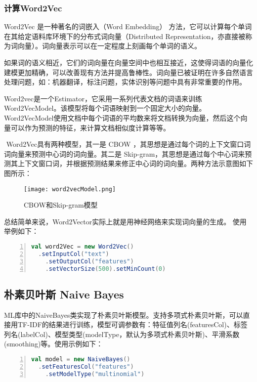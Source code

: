 \documentclass[lang=cn,11pt]{elegantpaper}
\begin{document}
\subsubsection{计算Word2Vec}
Word2Vec 是一种著名的词嵌入（Word Embedding） 方法，它可以计算每个单词在其给定语料库环境下的分布式词向量（Distributed Representation，亦直接被称为词向量）。词向量表示可以在一定程度上刻画每个单词的语义。

如果词的语义相近，它们的词向量在向量空间中也相互接近，这使得词语的向量化建模更加精确，可以改善现有方法并提高鲁棒性。词向量已被证明在许多自然语言处理问题，如：机器翻译，标注问题，实体识别等问题中具有非常重要的作用。

​ Word2vec是一个Estimator，它采用一系列代表文档的词语来训练Word2VecModel。该模型将每个词语映射到一个固定大小的向量。Word2VecModel使用文档中每个词语的平均数来将文档转换为向量，然后这个向量可以作为预测的特征，来计算文档相似度计算等等。

​ Word2Vec具有两种模型，其一是 CBOW ，其思想是通过每个词的上下文窗口词词向量来预测中心词的词向量。其二是 Skip-gram，其思想是通过每个中心词来预测其上下文窗口词，并根据预测结果来修正中心词的词向量。两种方法示意图如下图所示：
\begin{figure}[htbp]
	\centering
	\texttt{[image: word2vecModel.png]}
	\caption{CBOW和Skip-gram模型 \label{fig:Word2VecModel}}
\end{figure}
总结简单来说，Word2Vector实际上就是用神经网络来实现词向量的生成。
使用举例如下：
\begin{lstlisting}[language={Scala},numbers=left,numberstyle=\tiny,%frame=shadowbox,  
  rulesepcolor=\color{red!20!green!20!blue!20},  
  keywordstyle=\color{blue!70!black},  
  commentstyle=\color{blue!90!},  
  basicstyle=\ttfamily]  
val word2Vec = new Word2Vec()
  .setInputCol("text")
	.setOutputCol("features")
	.setVectorSize(500).setMinCount(0)
\end{lstlisting}\par

\subsection{朴素贝叶斯 Naive Bayes}
ML库中的NaiveBayes类实现了朴素贝叶斯模型。支持多项式朴素贝叶斯，可以直接用TF-IDF的结果进行训练，模型可调参数有：特征值列名(featuresCol)、标签列名(labelCol)、模型类型(modelType，默认为多项式朴素贝叶斯)、平滑系数(smoothing)等。使用示例如下：
\begin{lstlisting}[language={Scala},numbers=left,numberstyle=\tiny,%frame=shadowbox,  
  rulesepcolor=\color{red!20!green!20!blue!20},  
  keywordstyle=\color{blue!70!black},  
  commentstyle=\color{blue!90!},  
  basicstyle=\ttfamily]  
val model = new NaiveBayes()
  .setFeaturesCol("features")
	.setModelType("multinomial")
\end{lstlisting}
\end{document}
